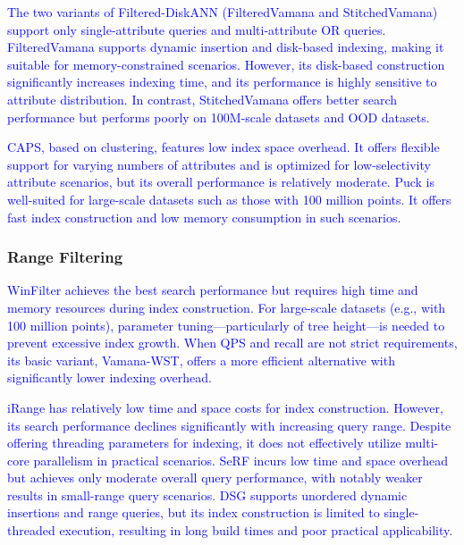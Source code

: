\documentclass[sigconf, nonacm]{acmart}
\begin{document}
{\textcolor{blue}{The two variants of Filtered-DiskANN (FilteredVamana and StitchedVamana) support only single-attribute queries and multi-attribute OR queries. FilteredVamana supports dynamic insertion and disk-based indexing, making it suitable for memory-constrained scenarios. However, its disk-based construction significantly increases indexing time, and its performance is highly sensitive to attribute distribution. In contrast, StitchedVamana offers better search performance but performs poorly on 100M-scale datasets and OOD datasets.}

\textcolor{blue}{
CAPS, based on clustering, features low index space overhead. It offers flexible support for varying numbers of attributes and is optimized for low-selectivity attribute scenarios, but its overall performance is relatively moderate.
Puck is well-suited for large-scale datasets such as those with 100 million points. It offers fast index construction and low memory consumption in such scenarios. 
}


	\subsubsection{Range Filtering}
\textcolor{blue}{
	WinFilter achieves the best search performance but requires high time and memory resources during index construction. For large-scale datasets (e.g., with 100 million points), parameter tuning—particularly of tree height—is needed to prevent excessive index growth. When QPS and recall are not strict requirements, its basic variant, Vamana-WST, offers a more efficient alternative with significantly lower indexing overhead.
		}
	
	\textcolor{blue}{
	iRange has relatively low time and space costs for index construction. However, its search performance declines significantly with increasing query range. Despite offering threading parameters for indexing, it does not effectively utilize multi-core parallelism in practical scenarios.
	SeRF incurs low time and space overhead but achieves only moderate overall query performance, with notably weaker results in small-range query scenarios.
	DSG supports unordered dynamic insertions and range queries, but its index construction is limited to single-threaded execution, resulting in long build times and poor practical applicability.}
	
}
\end{document}
